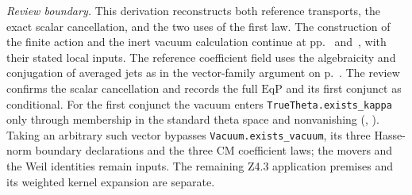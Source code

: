 \emph{Review boundary.} This derivation reconstructs both reference
transports, the exact scalar cancellation, and the two uses of the first
law. The construction of the finite action and the inert
vacuum calculation continue at pp.~\pageref{r14:weil-action}
and~\pageref{r14:weil-sign}, with their stated local inputs.
The reference coefficient field uses the algebraicity and conjugation of
averaged jets as in the vector-family argument on
p.~\pageref{r14:vec-fixed}. The review confirms the scalar cancellation and records the full
$\mathrm{EqP}$ and its first conjunct as conditional. For the first
conjunct the vacuum enters \nolinkurl{TrueTheta.exists_kappa} only
through membership in the standard theta space and nonvanishing
(,
).
Taking an arbitrary such vector bypasses \nolinkurl{Vacuum.exists_vacuum},
its three Hasse-norm boundary declarations and the three CM coefficient
laws; the movers and the Weil identities remain inputs. The remaining Z4.3
application premises and its weighted kernel expansion are separate.

